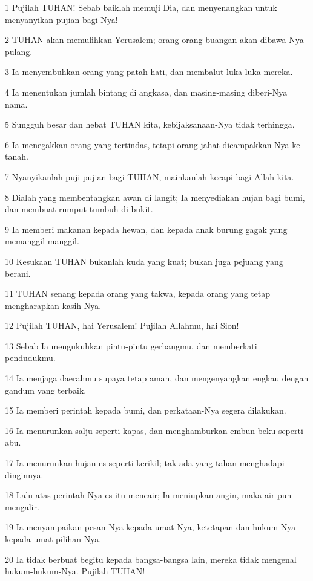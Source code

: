 \par 1 Pujilah TUHAN! Sebab baiklah memuji Dia, dan menyenangkan untuk menyanyikan pujian bagi-Nya!
\par 2 TUHAN akan memulihkan Yerusalem; orang-orang buangan akan dibawa-Nya pulang.
\par 3 Ia menyembuhkan orang yang patah hati, dan membalut luka-luka mereka.
\par 4 Ia menentukan jumlah bintang di angkasa, dan masing-masing diberi-Nya nama.
\par 5 Sungguh besar dan hebat TUHAN kita, kebijaksanaan-Nya tidak terhingga.
\par 6 Ia menegakkan orang yang tertindas, tetapi orang jahat dicampakkan-Nya ke tanah.
\par 7 Nyanyikanlah puji-pujian bagi TUHAN, mainkanlah kecapi bagi Allah kita.
\par 8 Dialah yang membentangkan awan di langit; Ia menyediakan hujan bagi bumi, dan membuat rumput tumbuh di bukit.
\par 9 Ia memberi makanan kepada hewan, dan kepada anak burung gagak yang memanggil-manggil.
\par 10 Kesukaan TUHAN bukanlah kuda yang kuat; bukan juga pejuang yang berani.
\par 11 TUHAN senang kepada orang yang takwa, kepada orang yang tetap mengharapkan kasih-Nya.
\par 12 Pujilah TUHAN, hai Yerusalem! Pujilah Allahmu, hai Sion!
\par 13 Sebab Ia mengukuhkan pintu-pintu gerbangmu, dan memberkati pendudukmu.
\par 14 Ia menjaga daerahmu supaya tetap aman, dan mengenyangkan engkau dengan gandum yang terbaik.
\par 15 Ia memberi perintah kepada bumi, dan perkataan-Nya segera dilakukan.
\par 16 Ia menurunkan salju seperti kapas, dan menghamburkan embun beku seperti abu.
\par 17 Ia menurunkan hujan es seperti kerikil; tak ada yang tahan menghadapi dinginnya.
\par 18 Lalu atas perintah-Nya es itu mencair; Ia meniupkan angin, maka air pun mengalir.
\par 19 Ia menyampaikan pesan-Nya kepada umat-Nya, ketetapan dan hukum-Nya kepada umat pilihan-Nya.
\par 20 Ia tidak berbuat begitu kepada bangsa-bangsa lain, mereka tidak mengenal hukum-hukum-Nya. Pujilah TUHAN!


